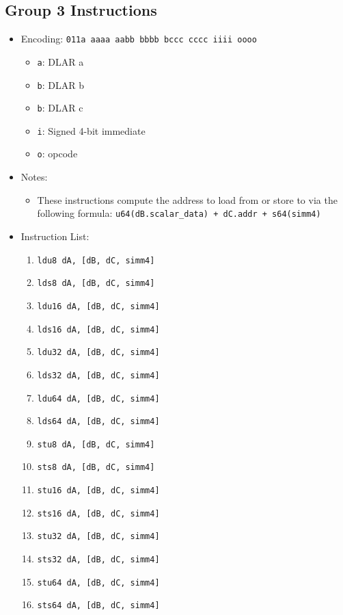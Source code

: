 \documentclass{article}
\begin{document}
	\subsection{Group 3 Instructions}
		\begin{itemize}
		\item Encoding:  \texttt{011a aaaa aabb bbbb  bccc cccc iiii oooo}
			\begin{itemize}
			\item \texttt{a}:  DLAR a
			\item \texttt{b}:  DLAR b
			\item \texttt{b}:  DLAR c
			\item \texttt{i}:  Signed 4-bit immediate
			\item \texttt{o}:  opcode
			\end{itemize}
		\item Notes:
			\begin{itemize}
			\item These instructions compute the address to load from or
				store to via the following formula:
				\texttt{u64(dB.scalar\_data) + dC.addr + s64(simm4)}
			\end{itemize}
		\item Instruction List:
			\begin{enumerate}
			\item \texttt{ldu8 dA, [dB, dC, simm4]}
			\item \texttt{lds8 dA, [dB, dC, simm4]}
			\item \texttt{ldu16 dA, [dB, dC, simm4]}
			\item \texttt{lds16 dA, [dB, dC, simm4]}

			\item \texttt{ldu32 dA, [dB, dC, simm4]}
			\item \texttt{lds32 dA, [dB, dC, simm4]}
			\item \texttt{ldu64 dA, [dB, dC, simm4]}
			\item \texttt{lds64 dA, [dB, dC, simm4]}

			\item \texttt{stu8 dA, [dB, dC, simm4]}
			\item \texttt{sts8 dA, [dB, dC, simm4]}
			\item \texttt{stu16 dA, [dB, dC, simm4]}
			\item \texttt{sts16 dA, [dB, dC, simm4]}

			\item \texttt{stu32 dA, [dB, dC, simm4]}
			\item \texttt{sts32 dA, [dB, dC, simm4]}
			\item \texttt{stu64 dA, [dB, dC, simm4]}
			\item \texttt{sts64 dA, [dB, dC, simm4]}
			\end{enumerate}
		\end{itemize}
\end{document}

